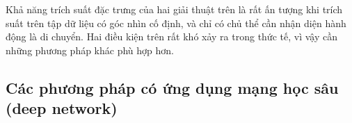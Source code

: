 Khả năng trích suất đặc trưng của hai giải thuật trên là rất ấn tượng khi trích suất trên tập dữ liệu có góc nhìn cố định, và chỉ có chủ thể cần nhận diện hành động là di chuyển. Hai điều kiện trên rất khó xảy ra trong thức tế, vì vậy cần những phương pháp khác phù hợp hơn.





\subsection{Các phương pháp có ứng dụng mạng học sâu (deep network)}

